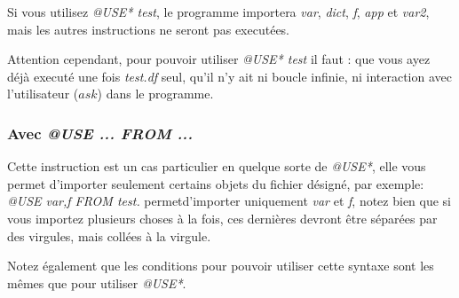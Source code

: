 \documentclass{article}
\begin{document}
Si vous utilisez \textit{@USE* test}, le programme importera \textit{var}, \textit{dict}, \textit{f}, \textit{app} et \textit{var2}, mais les autres instructions ne seront pas executées.

Attention cependant, pour pouvoir utiliser \textit{@USE* test} il faut : que vous ayez déjà executé une fois \textit{test.df} seul, qu'il n'y ait ni boucle infinie, ni interaction avec l'utilisateur ($ask$) dans le programme.

\subsubsection{Avec \textit{@USE ... FROM ...}}

Cette instruction est un cas particulier en quelque sorte de \textit{@USE*}, elle vous permet d'importer seulement certains objets du fichier désigné, par exemple:\\
\textit{@USE var,f FROM test.} permetd'importer uniquement \textit{var} et \textit{f}, notez bien que si vous importez plusieurs choses à la fois, ces dernières devront être séparées par des virgules, mais collées à la virgule.

Notez également que les conditions pour pouvoir utiliser cette syntaxe sont les mêmes que pour utiliser \textit{@USE*}.
\end{document}
